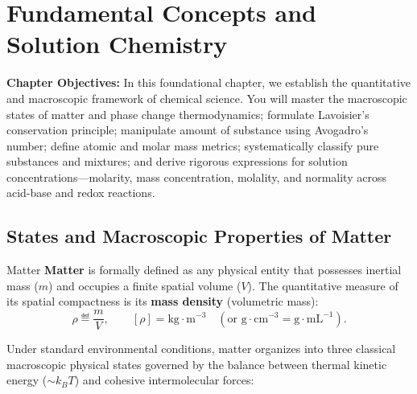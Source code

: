 \chapter{Fundamental Concepts and Solution Chemistry}
\label{ch:fundamental_concepts}

\begin{chapterintro}
\textbf{Chapter Objectives:} In this foundational chapter, we establish the quantitative and macroscopic framework of chemical science. You will master the macroscopic states of matter and phase change thermodynamics; formulate Lavoisier's conservation principle; manipulate amount of substance using Avogadro's number; define atomic and molar mass metrics; systematically classify pure substances and mixtures; and derive rigorous expressions for solution concentrations---molarity, mass concentration, molality, and normality across acid-base and redox reactions.
\end{chapterintro}

\section{States and Macroscopic Properties of Matter}

\begin{definitionbox}{Matter}
\textbf{Matter} is formally defined as any physical entity that possesses inertial mass ($m$) and occupies a finite spatial volume ($V$). The quantitative measure of its spatial compactness is its \textbf{mass density} (volumetric mass):
\begin{equation}
\rho \eqdef \frac{m}{V}, \qquad [\rho] = \mathrm{kg\cdot m^{-3}} \quad (\text{or } \mathrm{g\cdot cm^{-3}} = \mathrm{g\cdot mL^{-1}}).
\end{equation}
\end{definitionbox}

Under standard environmental conditions, matter organizes into three classical macroscopic physical states governed by the balance between thermal kinetic energy ($\sim k_B T$) and cohesive intermolecular forces:

